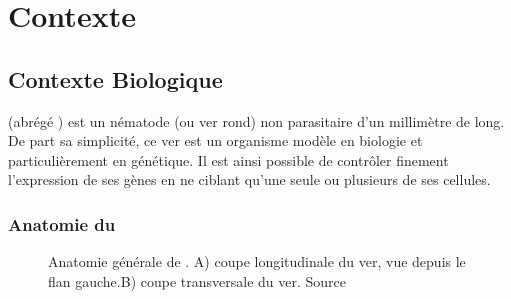 \chapter{Contexte} %
\label{cha:Contexte}




\section{Contexte Biologique} %
\label{sec:Contexte Biologique}

\caeleg{} (abrégé \celeg{}) est un nématode (ou ver rond) non parasitaire d'un
millimètre de long. De part sa simplicité, ce ver est un organisme modèle en biologie
et particulièrement en génétique. Il est ainsi possible de contrôler
finement l'expression de ses gènes en ne ciblant qu'une seule ou plusieurs de
ses cellules.

\subsection{Anatomie du \celeg{}} %
\label{sub:Anatomie du caeleg}

\begin{figure}[ht]
   \begin{center}
   \end{center}
   \caption[Anatomie générale de \caeleg{}]{Anatomie générale de \caeleg{}. A) coupe longitudinale du ver,
   vue depuis le flan gauche.B) coupe transversale du ver. Source
   \cite{Boyle2009}}
   \label{fig:celegans_anatomy}
\end{figure}

